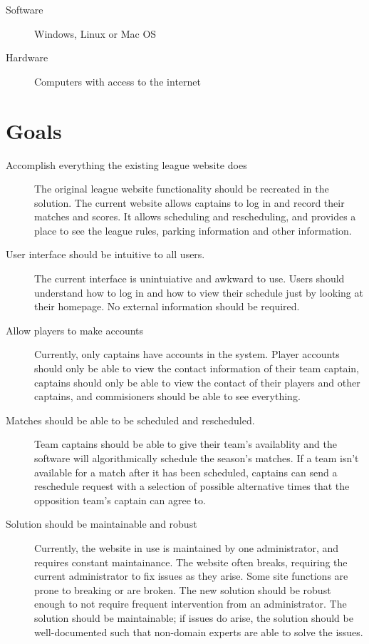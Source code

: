 \documentclass{article}
\begin{document}
\begin{description}
    \item [Software] Windows, Linux or Mac OS
    \item [Hardware] Computers with access to the internet
\end{description}

\section{Goals}

\begin{description}
    \item [Accomplish everything the existing league website does]
    The original league website functionality should be recreated in the
    solution. The current website allows captains to log in and record 
    their matches and scores. It allows scheduling and rescheduling, and
    provides a place to see the league rules, parking information and
    other information.
    \item [User interface should be intuitive to all users.] The current
    interface is unintuiative and awkward to use. Users should understand
    how to log in and how to view their schedule just by looking at their
    homepage. No external information should be required.
    \item [Allow players to make accounts] Currently, only captains have
    accounts in the system. Player accounts should only be able to view the
    contact information of their team captain, captains should only be able
    to view the contact of their players and other captains, and commisioners
    should be able to see everything.
    \item [Matches should be able to be scheduled and rescheduled.] 
    Team captains should be able to give their team's availablity and the
    software will algorithmically schedule the season's matches. If a team
    isn't available for a match after it has been scheduled, captains can
    send a reschedule request with a selection of possible alternative times
    that the opposition team's captain can agree to.
    \item [Solution should be maintainable and robust] 
    Currently, the website in use is maintained by one administrator, and
    requires constant maintainance. The website often breaks, requiring 
    the current administrator to fix issues as they arise. Some site 
    functions are prone to breaking or are broken. The new solution should 
    be robust enough to not require frequent intervention from an administrator.
    The solution should be maintainable; if issues do arise, the solution  
    should be well-documented such that non-domain experts are able to 
    solve the issues.
\end{description}
\end{document}
